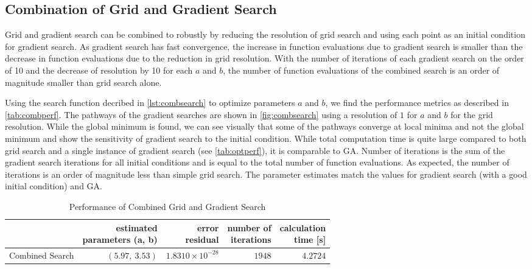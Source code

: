 \documentclass[11pt,a4paper]{article}
\begin{document}
\subsection{Combination of Grid and Gradient Search}
Grid and gradient search can be combined to robustly by reducing the resolution
of grid search and using each point as an initial condition for gradient
search. As gradient search has fast convergence, the increase in function
evaluations due to gradient search is smaller than the decrease in function
evaluations due to the reduction in grid resolution. With the number of
iterations of each gradient search on the order of 10 and the decrease of
resolution by 10 for each $a$ and $b$, the number of function evaluations of
the combined search is an order of magnitude smaller than grid search alone.

Using the search function decribed in \autoref{lst:combsearch} to optimize
parameters $a$ and $b$, we find the performance metrics as described in
\autoref{tab:combperf}. The pathways of the gradient searches are shown in
\autoref{fig:combsearch} using a resolution of $1$ for $a$ and $b$ for the grid
resolution. While the global minimum is found, we can see visually that some of
the pathways converge at local minima and not the global minimum and show the
sensitivity of gradient search to the initial condition. While total
computation time is quite large compared to both grid search and a single
instance of gradient search (see \autoref{tab:optperf}), it is comparable to
GA. Number of iterations is the sum of the gradient search iterations for all
initial conditions and is equal to the total number of function evaluations. As
expected, the number of iterations is an order of magnitude less than simple
grid search. The parameter estimates match the values for gradient search (with
a good initial condition) and GA.

\begin{table}
    \centering
    \begin{tabular}{|l|r|r|r|r|}
        \hline
        \nonumber & \shortstack[c]{estimated\\parameters (a, b)} &
            \shortstack[c]{error\\residual} &
            \shortstack[c]{number of\\iterations} &
            \shortstack[c]{calculation\\time [s]} \\
        \hline
        Combined Search & $ (5.97,\: 3.53) $ & $ 1.8310 \times 10^{-28} $ &
            $ 1948 $ & $ 4.2724 $ \\
        \hline
    \end{tabular}
    \caption{Performance of Combined Grid and Gradient Search}
    \label{tab:combperf}
\end{table}
\end{document}
